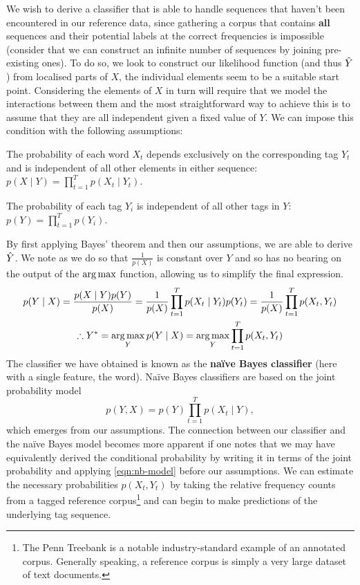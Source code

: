 \documentclass[../main.tex]{subfiles}
\begin{document}
We wish to derive a classifier that is able to handle sequences that haven't been encountered in our reference data, since gathering a corpus that contains \textbf{all} sequences and their potential labels at the correct frequencies is impossible (consider that we can construct an infinite number of sequences by joining pre-existing ones).
To do so, we look to construct our likelihood function (and thus $\hat{Y}$) from localised parts of $X$, the individual elements seem to be a suitable start point.
Considering the elements of $X$ in turn will require that we model the interactions between them and the most straightforward way to achieve this is to assume that they are all independent given a fixed value of $Y$. We can impose this condition with the following assumptions:
\begin{assumption} \label{ass:ind-obs}
The probability of each word $X_t$ depends exclusively on the corresponding tag $Y_t$ and is independent of all other elements in either sequence: $p(X \mid Y) = \prod_{t=1}^T p(X_t \mid Y_t)$.
\end{assumption}
\begin{assumption} \label{ass:ind-tags}
The probability of each tag $Y_i$ is independent of all other tags in $Y$: $p(Y) = \prod_{t=1}^T p (Y_i)$.
\end{assumption}

By first applying Bayes' theorem and then our assumptions, we are able to derive $\hat{Y}$. We note as we do so that $\frac{1}{p(X)}$ is constant over $Y$ and so has no bearing on the output of the $\operatorname*{arg\,max}$ function, allowing us to simplify the final expression.
\begin{gather*}
    p(Y \mid X) = \frac{p(X \mid Y)p(Y)}{p(X)} = \frac{1}{p(X)}\prod_{t=1}^T p(X_t \mid Y_t)p(Y_t) = \frac{1}{p(X)}\prod_{t=1}^T p(X_t, Y_t) \\
    \therefore Y^* = \operatorname*{arg\,max}_Y p(Y \mid X) = \operatorname*{arg\,max}_Y \prod_{t=1}^T p(X_t, Y_t)
\end{gather*}
The classifier we have obtained is known as the \textbf{na{\"i}ve Bayes classifier} (here with a single feature, the word). Na{\"i}ve Bayes classifiers are based on the joint probability model
\begin{equation} \label{eqn:nb-model}
    p(Y,X) = p(Y)\prod_{t=1}^T p(X_t \mid Y),
\end{equation}
which emerges from our assumptions.
The connection between our classifier and the na{\"i}ve Bayes model becomes more apparent if one notes that we may have equivalently derived the conditional probability by writing it in terms of the joint probability and applying \cref{eqn:nb-model} before our assumptions.
We can estimate the necessary probabilities $p(X_t,Y_t)$ by taking the relative frequency counts from a tagged reference corpus\footnote{The Penn Treebank is a notable industry-standard example of an annotated corpus. Generally speaking, a reference corpus is simply a very large dataset of text documents.} and can begin to make predictions of the underlying tag sequence.
\end{document}
